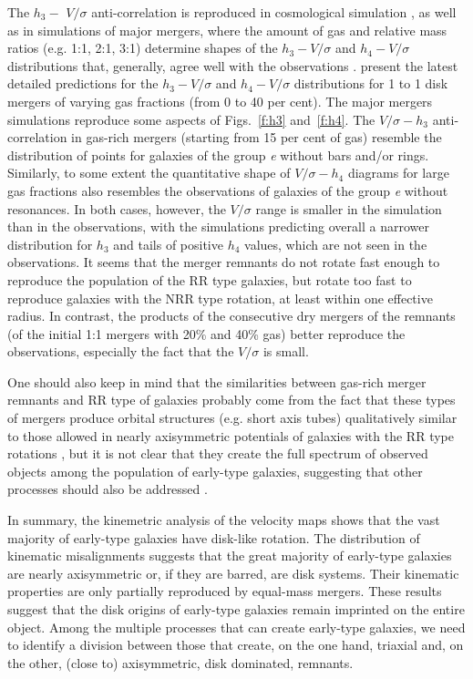 \documentclass[usenatbib,usegraphicx]{mn2e}
\begin{document}
The $h_3 -$ $V/\sigma$ anti-correlation is reproduced in cosmological simulation \citep{2007ApJ...658..710N}, as well as in simulations of major mergers, where the amount of gas and relative mass ratios (e.g. 1:1, 2:1, 3:1) determine shapes of the $h_3 - V/\sigma$ and $h_4 - V/\sigma$ distributions that, generally, agree well with the observations \citep{2006MNRAS.372L..78G, 2006MNRAS.372..839N}. \citet{2009ApJ...705..920H} present the latest detailed predictions for the $h_3 - V/\sigma$ and $h_4 - V/\sigma$ distributions for 1 to 1 disk mergers of varying gas fractions (from 0 to 40 per cent). The major mergers simulations reproduce some aspects of Figs.~\ref{f:h3} and~\ref{f:h4}. The $V/\sigma-h_3$ anti-correlation in gas-rich mergers (starting from 15 per cent of gas) resemble the distribution of points for galaxies of the group {\it e} without bars and/or rings. Similarly, to some extent the quantitative shape of $V/\sigma-h_4$ diagrams for large gas fractions also resembles the observations of galaxies of the group {\it e} without resonances. In both cases, however, the $V/\sigma$ range is smaller in the simulation than in the observations, with the simulations predicting overall a narrower distribution for $h_3$ and tails of positive $h_4$ values, which are not seen in the observations. It seems that the merger remnants do not rotate fast enough to reproduce the population of the RR type galaxies, but rotate too fast to reproduce galaxies with the NRR type rotation, at least within one effective radius. In contrast, the products of the consecutive dry mergers of the remnants (of the initial 1:1 mergers with 20\% and 40\% gas) better reproduce the observations, especially the fact that the $V/\sigma$ is small.

One should also keep in mind that the similarities between gas-rich merger remnants and RR type of galaxies probably come from the fact that these types of mergers produce orbital structures (e.g. short axis tubes) qualitatively similar to those allowed in nearly axisymmetric potentials of galaxies with the RR type rotations \citep{2005MNRAS.360.1185J,2010ApJ...723..818H}, but it is not clear that they create the full spectrum of observed objects among the population of early-type galaxies, suggesting that other processes should also be addressed \citep[e.g.][]{2006ApJ...636L..81N}. 

In summary, the kinemetric analysis of the velocity maps shows that the vast majority of early-type galaxies have disk-like rotation. The distribution of kinematic misalignments suggests that the great majority of early-type galaxies are nearly axisymmetric or, if they are barred, are disk systems. Their kinematic properties are only partially reproduced by equal-mass mergers. These results suggest that the disk origins of early-type galaxies remain imprinted on the entire object. Among the multiple processes that can create early-type galaxies, we need to identify a division between those that create, on the one hand, triaxial and, on the other, (close to) axisymmetric, disk dominated, remnants. 
\end{document}
